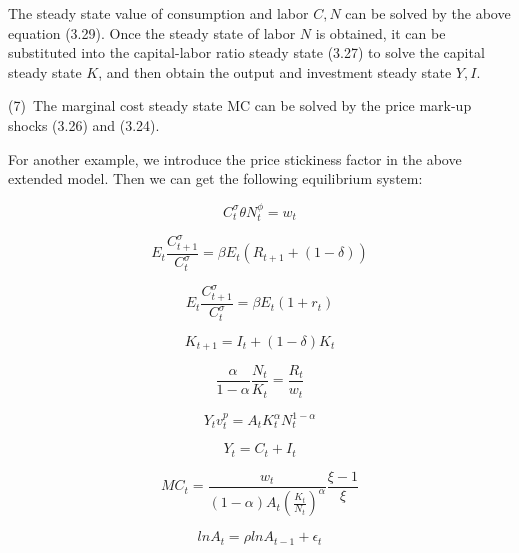 \documentclass[10pt,math=newtx,citestyle=gb7714-2015,bibstyle=gb7714-2015]{elegantbook}
\begin{document}
	The steady state value of consumption and labor $C,N$ can be solved by the above equation (3.29). Once the steady state of labor $N$ is obtained, it can be substituted into the capital-labor ratio steady state (3.27) to solve the capital steady state $K$, and then obtain the output and investment steady state $Y,I$.
	
	(7)~The marginal cost steady state MC can be solved by the price mark-up shocks (3.26) and (3.24).
	

     For another example, we introduce the price stickiness factor in the above extended model. Then we can get the following equilibrium system:
	
	\begin{equation}\label{label}
		C_t^{\sigma}\theta N_t^{\phi}=w_t
	\end{equation}
	
	\begin{equation}\label{label}
		E_t\frac{C_{t+1}^{\sigma}}{C_t^{\sigma}}=\beta E_t(R_{t+1}+(1-\delta))
	\end{equation}
	
	\begin{equation}\label{label}
		E_t\frac{C_{t+1}^{\sigma}}{C_t^{\sigma}}=\beta E_t(1+r_t)
	\end{equation}
	
	\begin{equation}\label{label}
		K_{t+1}=I_t+(1-\delta)K_t
	\end{equation}
	
	\begin{equation}\label{label}
		\frac{\alpha}{1-\alpha} \frac{N_t}{K_t}=\frac{R_t}{w_t}
	\end{equation}
	
	\begin{equation}\label{label}
		Y_tv_t^p=A_tK_t^{\alpha}N_t^{1-\alpha}
	\end{equation}
	
	\begin{equation}\label{label}
		Y_t=C_t+I_t
	\end{equation}
	
	\begin{equation}\label{label}
		MC_t=\frac{w_t}{(1-\alpha)A_t(\frac{K_t}{N_t})^{\alpha}}\frac{\xi-1}{\xi}
	\end{equation}
	
	\begin{equation}\label{label}
		lnA_t=\rho lnA_{t-1}+\epsilon_t
	\end{equation}
	
\end{document}
